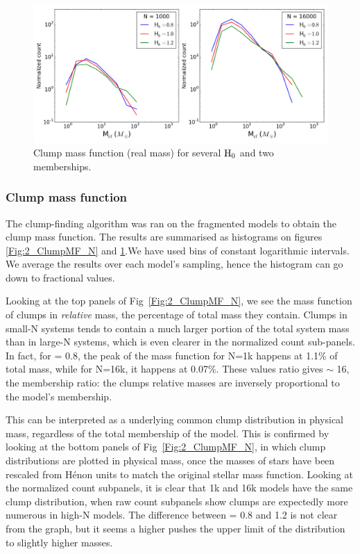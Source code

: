 \begin{figure}
\begin{center}
\includegraphics[width=0.95\columnwidth]{Figures/2_ClumpMF_H.png}
\end{center}
\caption{Clump mass function (real mass) for several ${\textrm{H}}_0$  and two memberships.}
\label{Fig:2_ClumpMF_H}
\end{figure} 


\subsubsection*{Clump mass function}
 The clump-finding algorithm was ran on the fragmented models to obtain the clump mass function. The results are summarised as histograms on figures \ref{Fig:2_ClumpMF_N} and \ref{Fig:2_ClumpMF_H}.We have used bins of constant logarithmic intervals. We average the results over each model's sampling, hence the histogram can go down to fractional values.
 
 Looking at the top panels of Fig~\ref{Fig:2_ClumpMF_N}, we see the mass function of clumps in \textit{relative} mass, the percentage of total mass they contain.  Clumps in small-N systems tends to contain a much larger portion of the total system mass than in large-N systems, which is even clearer in the normalized count sub-panels. In fact, for \tHub = 0.8, the peak of the mass function for N=1k happens at 1.1\% of total mass, while for N=16k, it happens at 0.07\%. These values ratio gives $\sim$ 16, the membership ratio: the clumps relative masses are inversely proportional to the model's membership.
 
This can be interpreted as a underlying common clump distribution in physical mass, regardless of the total membership of the model. This is confirmed by looking at the bottom panels of Fig~\ref{Fig:2_ClumpMF_N}, in which clump distributions are plotted in physical mass, once the masses of stars have been rescaled from H\'enon units to match the original stellar mass function. Looking at the normalized count subpanels, it is clear that 1k and 16k models have the same clump distribution, when raw count subpanels show clumps are expectedly more numerous in high-N models. The difference between \tHub = 0.8 and 1.2 is not clear from the graph, but it seems a higher \tHub pushes the upper limit of the distribution to slightly higher masses.

